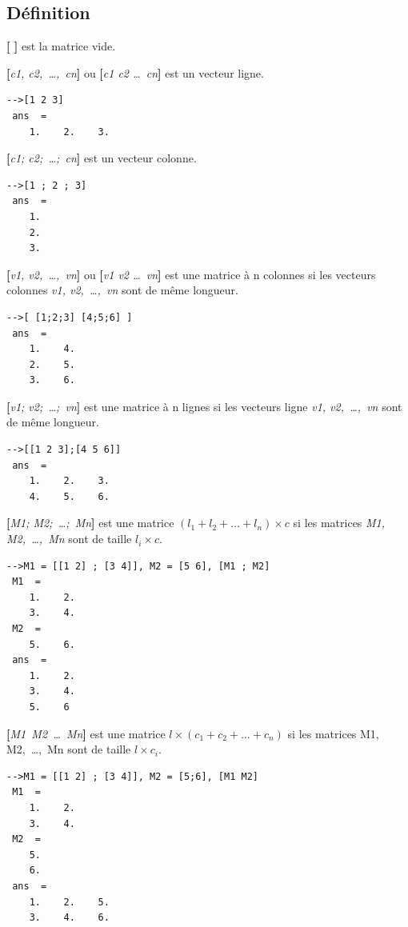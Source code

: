 \documentclass{article}
\begin{document}
\begin{multicols}{3}
\subsection*{Définition}
\begin{description}
\item{\textbf{[ ]}} est la matrice vide.
\item{\textbf{[}\textit{c1, c2,~\ldots ,~cn}\textbf{]} ou \textbf{[}\textit{c1 c2 \ldots ~cn}\textbf{]}} est un vecteur ligne.
\begin{verbatim}
-->[1 2 3]  
 ans  =
    1.    2.    3. 
\end{verbatim}
\item{\textbf{[}\textit{c1; c2;~\ldots ;~cn}\textbf{]}} est un vecteur colonne.
\begin{verbatim}
-->[1 ; 2 ; 3]  
 ans  =
    1.
    2.
    3. 
\end{verbatim}
\item{\textbf{[}\textit{v1, v2,~\ldots ,~vn}\textbf{]} ou \textbf{[}\textit{v1 v2 \ldots ~vn}\textbf{]}} est une matrice à n colonnes si les vecteurs colonnes \textit{v1, v2,~\ldots ,~vn} sont de même longueur.
\begin{verbatim}
-->[ [1;2;3] [4;5;6] ]
 ans  = 
    1.    4.  
    2.    5.  
    3.    6.
\end{verbatim}   
\item{\textbf{[}\textit{v1; v2;~\ldots ;~vn}\textbf{]}} est une matrice à n lignes si les vecteurs ligne \textit{v1, v2,~\ldots ,~vn} sont de même longueur.
\begin{verbatim}
-->[[1 2 3];[4 5 6]]  
 ans  =
    1.    2.    3.  
    4.    5.    6.  
\end{verbatim}
\item{\textbf{[}\textit{M1; M2;~\ldots ;~Mn}\textbf{]}} est une matrice $(l_{1}+l_{2}+\ldots+l_{n}) \times c$ si les matrices \textit{M1, M2,~\ldots ,~Mn} sont de taille $l_{i} \times c$.
\begin{verbatim}
-->M1 = [[1 2] ; [3 4]], M2 = [5 6], [M1 ; M2]
 M1  =
    1.    2.  
    3.    4.  
 M2  = 
    5.    6.  
 ans  =
    1.    2.  
    3.    4.  
    5.    6  
\end{verbatim}
\item{\textbf{[}\textit{M1~M2~\ldots ~Mn}\textbf{]}} est une matrice $l \times (c_{1}+c_{2}+\ldots+c_{n})$ si les matrices M1, M2,~\ldots ,~Mn sont de taille $l \times c_{i}$.
\begin{verbatim}
-->M1 = [[1 2] ; [3 4]], M2 = [5;6], [M1 M2]
 M1  =
    1.    2.  
    3.    4.  
 M2  =
    5.  
    6.  
 ans  =
    1.    2.    5.  
    3.    4.    6.  
\end{verbatim}
\end{description}

\end{multicols}
\end{document}
